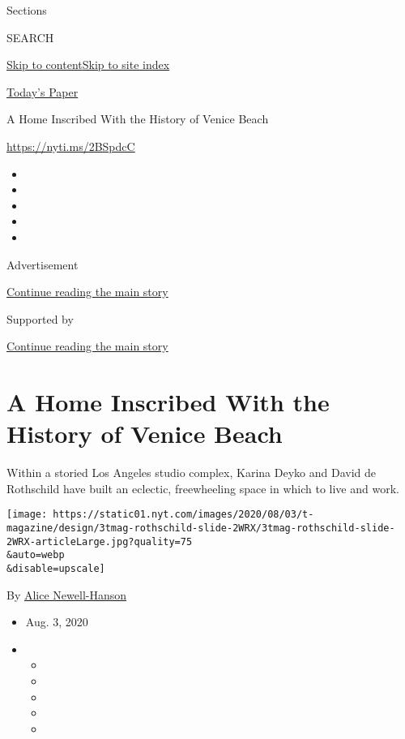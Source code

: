 Sections

SEARCH

\protect\hyperlink{site-content}{Skip to
content}\protect\hyperlink{site-index}{Skip to site index}

\href{https://myaccount.nytimes.com/auth/login?response_type=cookie\&client_id=vi}{}

\href{https://www.nytimes.com/section/todayspaper}{Today's Paper}

A Home Inscribed With the History of Venice Beach

\url{https://nyti.ms/2BSpdcC}

\begin{itemize}
\item
\item
\item
\item
\item
\end{itemize}

Advertisement

\protect\hyperlink{after-top}{Continue reading the main story}

Supported by

\protect\hyperlink{after-sponsor}{Continue reading the main story}

\hypertarget{a-home-inscribed-with-the-history-of-venice-beach}{%
\section{A Home Inscribed With the History of Venice
Beach}\label{a-home-inscribed-with-the-history-of-venice-beach}}

Within a storied Los Angeles studio complex, Karina Deyko and David de
Rothschild have built an eclectic, freewheeling space in which to live
and work.

\texttt{[image: https://static01.nyt.com/images/2020/08/03/t-magazine/design/3tmag-rothschild-slide-2WRX/3tmag-rothschild-slide-2WRX-articleLarge.jpg?quality=75\\\&auto=webp\\\&disable=upscale]}

By \href{https://www.nytimes.com/by/alice-newell-hanson}{Alice
Newell-Hanson}

\begin{itemize}
\item
  Aug. 3, 2020
\item
  \begin{itemize}
  \item
  \item
  \item
  \item
  \item
  \end{itemize}
\end{itemize}

